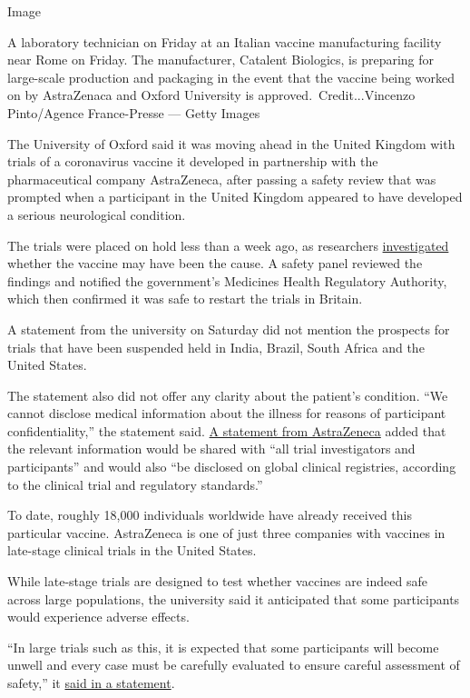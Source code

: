 Image

A laboratory technician on Friday at an Italian vaccine manufacturing
facility near Rome on Friday. The manufacturer, Catalent Biologics, is
preparing for large-scale production and packaging in the event that the
vaccine being worked on by AstraZenaca and Oxford University is
approved.~Credit...Vincenzo Pinto/Agence France-Presse --- Getty Images

The University of Oxford said it was moving ahead in the United Kingdom
with trials of a coronavirus vaccine it developed in partnership with
the pharmaceutical company AstraZeneca, after passing a safety review
that was prompted when a participant in the United Kingdom appeared to
have developed a serious neurological condition.

The trials were placed on hold less than a week ago, as researchers
\href{Http://www.nytimes3xbfgragh.onion/2020/09/08/health/coronavirus-astrazeneca-vaccine-safety.html}{investigated}
whether the vaccine may have been the cause. A safety panel reviewed the
findings and notified the government's Medicines Health Regulatory
Authority, which then confirmed it was safe to restart the trials in
Britain.

A statement from the university on Saturday did not mention the
prospects for trials that have been suspended held in India, Brazil,
South Africa and the United States.

The statement also did not offer any clarity about the patient's
condition. ``We cannot disclose medical information about the illness
for reasons of participant confidentiality,'' the statement said.
\href{https://www.astrazeneca.com/media-centre/press-releases/2020/covid-19-vaccine-azd1222-clinical-trials-resumed-in-the-uk.html}{A
statement from AstraZeneca} added that the relevant information would be
shared with ``all trial investigators and participants'' and would also
``be disclosed on global clinical registries, according to the clinical
trial and regulatory standards.''

To date, roughly 18,000 individuals worldwide have already received this
particular vaccine. AstraZeneca is one of just three companies with
vaccines in late-stage clinical trials in the United States.

While late-stage trials are designed to test whether vaccines are indeed
safe across large populations, the university said it anticipated that
some participants would experience adverse effects.

``In large trials such as this, it is expected that some participants
will become unwell and every case must be carefully evaluated to ensure
careful assessment of safety,'' it
\href{https://covid19vaccinetrial.co.uk/trial-resumes}{said in a
statement}.

